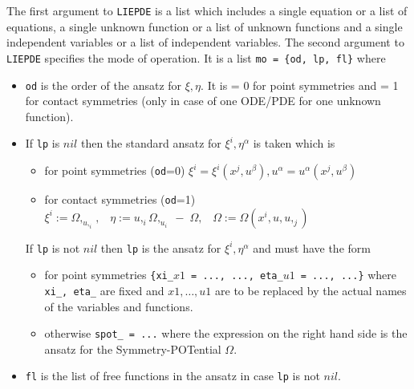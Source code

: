 The first argument to {\tt LIEPDE} is a list which includes
a single equation or a list of equations,
a single unknown function or a list of unknown functions and
a single independent variables or a list of independent variables.
The second argument to {\tt LIEPDE} specifies the mode of operation.
It is a list {\tt mo = \{od, lp, fl\}} where
\begin{itemize}
\item {\tt od} is the order of the ansatz for $\xi, \eta.$ It is = 0 for
point symmetries and = 1 for contact symmetries (only in case of
one ODE/PDE for one unknown function).
\item If {\tt lp} is $nil$ then the standard ansatz for $\xi^i, \eta^\alpha$
is taken which is
\begin{itemize}
\item for point symmetries ({\tt od}=0) $\xi^i = \xi^i(x^j,u^\beta),
      u^\alpha = u^\alpha(x^j,u^\beta)$
\item for contact symmetries ({\tt od}=1)
   $ \xi^i := \Omega,_{u,_i}, \;\;\;
     \eta := u,_i\Omega,_{u_i} \; - \; \Omega, \;\;\;
     \Omega:=\Omega(x^i, u, u,_j)$
\end{itemize}


If {\tt lp} is not $nil$ then {\tt lp} is the ansatz for
$\xi^i, \eta^\alpha$ and must have the form
\begin{itemize}
  \item for point symmetries
        {\tt \{xi\_\mbox{$x1$} = ..., ..., eta\_\mbox{$u1$} = ..., ...\}}
        where {\tt xi\_, eta\_}
        are fixed and $x1, \ldots, u1$ are to be replaced by the actual names
        of the variables and functions.
  \item otherwise {\tt spot\_ = ...} where the expression on the right hand
        side is the ansatz for the Symmetry-POTential $\Omega.$
\end{itemize}

\item {\tt fl} is the list of free functions in the ansatz
in case {\tt lp} is not $nil.$
\end{itemize}

